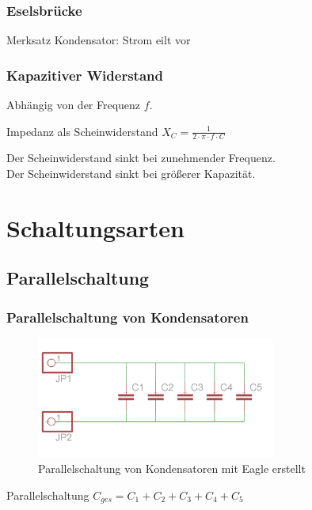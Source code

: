 \begin{frame}
  \frametitle{Eselsbrücke}
  \begin{block}{Merksatz}
    Kondensator: Strom eilt vor
  \end{block}
\end{frame}

\begin{frame}
  \frametitle{Kapazitiver Widerstand}

  Abhängig von der Frequenz $f$.

  \begin{block}{Impedanz als Scheinwiderstand}
    \huge{$X_C = \frac{1}{2 \cdot \pi \cdot f \cdot C}$}
  \end{block}

  \pause
  Der Scheinwiderstand sinkt bei zunehmender Frequenz.\\
  Der Scheinwiderstand sinkt bei größerer Kapazität.
\end{frame}




\section*{Schaltungsarten}

\subsection*{Parallel\-schaltung}

\begin{frame}
  \frametitle{Parallelschaltung von Kondensatoren}
  \begin{center}
    \begin{figure}
      \includegraphics[width=0.7\textwidth,height=.5\textheight,keepaspectratio]{e05/c-parallel.png}
      \caption{Parallelschaltung von Kondensatoren {\tiny mit Eagle erstellt}}
    \end{figure}
  \end{center}
  \begin{block}{Parallelschaltung}
    $C_{ges} = C_1 + C_2 + C_3 + C_4 + C_5$
  \end{block}
\end{frame}

